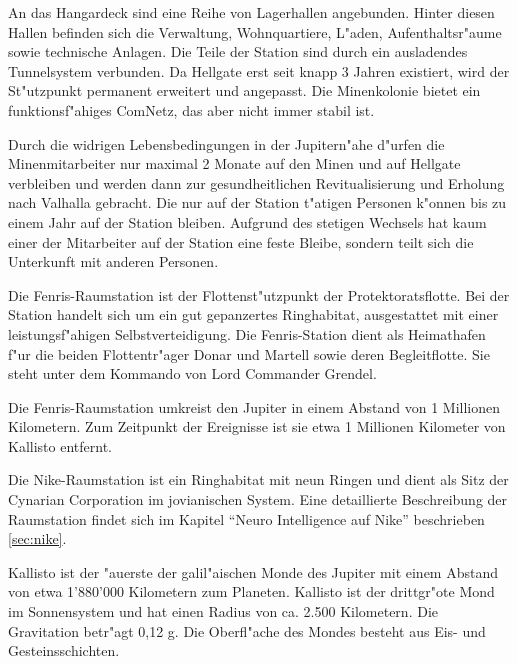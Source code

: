 An das Hangardeck sind eine Reihe von Lagerhallen angebunden. Hinter diesen Hallen befinden sich die Verwaltung, Wohnquartiere, L"aden, Aufenthaltsr"aume sowie technische Anlagen. Die Teile der Station sind durch ein ausladendes Tunnelsystem verbunden. Da Hellgate erst seit knapp 3 Jahren existiert, wird der St"utzpunkt permanent erweitert und angepasst. Die Minenkolonie bietet ein funktionsf"ahiges ComNetz, das aber nicht immer stabil ist.

Durch die widrigen Lebensbedingungen in der Jupitern"ahe d"urfen die Minenmitarbeiter nur maximal 2 Monate auf den Minen und auf Hellgate verbleiben und werden dann zur gesundheitlichen Revitualisierung und Erholung nach Valhalla gebracht. Die nur auf der Station t"atigen Personen k"onnen bis zu einem Jahr auf der Station bleiben. Aufgrund des stetigen Wechsels hat kaum einer der Mitarbeiter auf der Station eine feste Bleibe, sondern teilt sich die Unterkunft mit anderen Personen.

Die Fenris-Raumstation ist der Flottenst"utzpunkt der Protektoratsflotte. Bei der Station handelt sich um ein gut gepanzertes Ringhabitat, ausgestattet mit einer leistungsf"ahigen Selbstverteidigung. Die Fenris-Station dient als Heimathafen f"ur die beiden Flottentr"ager Donar und Martell sowie deren Begleitflotte. Sie steht unter dem Kommando von Lord Commander Grendel.

Die Fenris-Raumstation umkreist den Jupiter in einem Abstand von 1 Millionen Kilometern. Zum Zeitpunkt der Ereignisse ist sie etwa 1 Millionen Kilometer von Kallisto entfernt.


Die Nike-Raumstation ist ein Ringhabitat mit neun Ringen und dient als Sitz der Cynarian Corporation im jovianischen System. Eine detaillierte Beschreibung der Raumstation findet sich im Kapitel ``Neuro Intelligence auf Nike'' beschrieben \cref{sec:nike}.

\clearpage\newpage



Kallisto ist der "au\3erste der galil"aischen Monde des Jupiter mit einem Abstand von etwa  1'880'000 Kilometern zum Planeten. Kallisto ist der drittgr"o\3te Mond im Sonnensystem und hat einen Radius von ca. 2.500 Kilometern. Die Gravitation betr"agt 0,12 g.  Die Oberfl"ache des Mondes besteht aus Eis- und Gesteinsschichten.

